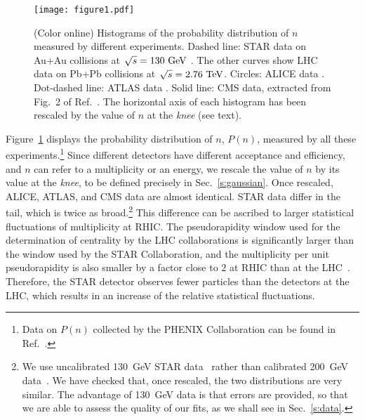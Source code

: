 \documentclass[aps,prc,twocolumn,superscriptaddress,showpacs,floatfix,nofootinbib]{revtex4-1}
\begin{document}
\begin{figure}[t!]
\begin{center}
\texttt{[image: figure1.pdf]} 
\end{center}
\caption{(Color online) Histograms of the probability distribution of $n$ measured by different experiments. Dashed line: STAR data on Au+Au collisions at $~\sqrt[]{s}=130~{\rm GeV}$ \cite{Adamczyk:2015obl}. The other curves show LHC data on Pb+Pb collisions at $~\sqrt[]{s}=2.76~{\rm TeV}$. Circles: ALICE data \cite{Abelev:2013qoq}. Dot-dashed line: ATLAS data \cite{ATLAS:2011ah}. Solid line: CMS data, extracted from Fig.~2 of Ref.~\cite{Chatrchyan:2012vq}. The horizontal axis of each histogram has been rescaled by the value of $n$ at the \textit{knee} (see text).}
\label{fig:allexp}
\end{figure} 
Figure~\ref{fig:allexp} displays the probability distribution of $n$, $P(n)$, measured by all these experiments.\footnote{Data on $P(n)$ collected by the PHENIX Collaboration can be found in Ref.~\cite{Adler:2004zn}.}
Since different detectors have different acceptance and efficiency, and $n$ can refer to a multiplicity or an energy, we rescale the value of $n$ by its value at the \textit{knee}, to be defined precisely in Sec.~\ref{s:gaussian}. 
Once rescaled, ALICE, ATLAS, and CMS data are almost identical.
STAR data differ in the tail, which is twice as  broad.\footnote{We use uncalibrated 130~GeV STAR data~\cite{Adler:2001yq} rather than calibrated 200~GeV data~\cite{Adamczyk:2015obl}. We have checked that, once rescaled, the two distributions are very similar. The advantage of 130~GeV data is that errors are provided, so that we are able to assess the quality of our fits, as we shall see in Sec.~\ref{s:data}.}
This difference can be ascribed to larger statistical fluctuations of multiplicity at RHIC. 
The pseudorapidity window used for the determination of centrality by the LHC collaborations is significantly larger than the window used by the STAR Collaboration, and the multiplicity per unit pseudorapidity is also smaller by a factor close to $2$ at RHIC than at the LHC~\cite{Aamodt:2010pb}. 
Therefore, the STAR detector observes fewer particles than the detectors at the LHC, which results in an increase of the relative statistical fluctuations.
\end{document}
